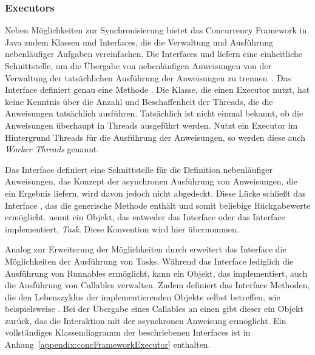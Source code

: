 \subsubsection{Executors}\label{sec:executor} Neben Möglichkeiten zur Synchronisierung bietet das Concurrency Framework in Java zudem Klassen und Interfaces, die die Verwaltung und Ausführung nebenläufiger Aufgaben vereinfachen. Die Interfaces  und  liefern eine einheitliche Schnittstelle, um die Übergabe von nebenläufigen Anweisungen von der Verwaltung der tatsächlichen Ausführung der Anweisungen zu trennen~\cite[S.~70~ff.]{Friesen2015}. Das Interface  definiert genau eine Methode . Die Klasse, die einen Executor nutzt, hat keine Kenntnis über die Anzahl und Beschaffenheit der Threads, die die Anweisungen tatsächlich ausführen. Tatsächlich ist nicht einmal bekannt, ob die Anweisungen überhaupt in Threads ausgeführt werden. Nutzt ein Executor im Hintergrund Threads für die Ausführung der Anweisungen, so werden diese auch \emph{Worker Threads} genannt.

Das Interface  definiert eine Schnittstelle für die Definition nebenläufiger Anweisungen, das Konzept der asynchronen Ausführung von Anweisungen, die ein Ergebnis liefern, wird davon jedoch nicht abgedeckt. Diese Lücke schließt das Interface , das die generische Methode  enthält und somit beliebige Rückgabewerte ermöglicht. \textcite{Friesen2015} nennt ein Objekt, das entweder das Interface  oder das Interface  implementiert, \emph{Task}. Diese Konvention wird hier übernommen. 

Analog zur Erweiterung der Möglichkeiten durch  erweitert das Interface  die Möglichkeiten der Ausführung von Tasks. Während das Interface  lediglich die Ausführung von Runnables ermöglicht, kann ein Objekt, das  implementiert, auch die Ausführung von Callables verwalten. Zudem definiert das Interface Methoden, die den Lebenszyklus der implementierenden Objekte selbst betreffen, wie beispielsweise . Bei der Übergabe eines Callables an einen  gibt dieser ein Objekt  zurück, das die Interaktion mit der asynchronen Anweisung ermöglicht. Ein vollständiges Klassendiagramm der beschriebenen Interfaces ist in Anhang~\vref{appendix:concFrameworkExecutor} enthalten.

